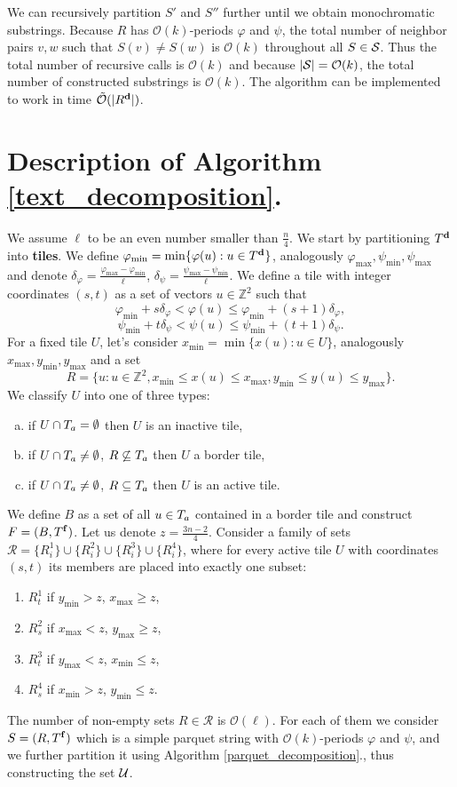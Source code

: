 \documentclass[a4paper]{article}
\newcommand{\Z}{\mathbb{Z}}
\renewcommand{\O}{\mathcal{O}}
\newcommand{\tO}{\tilde{\mathcal{O}}}
\renewcommand{\phi}{\varphi}
\newcommand{\set}[1]{\lbrace #1 \rbrace}
\begin{document}
We can recursively partition $S'$ and $S''$ further until we obtain monochromatic substrings.
Because $R$ has $\O(k)$-periods $\phi$ and $\psi$, the total number of neighbor pairs $v, w$ such that $S(v) \neq S(w)$ is $\O(k)$ throughout all $S \in \S$.
Thus the total number of recursive calls is $\O(k)$ and because $|\S| = \O(k)$, the total number of constructed substrings is $\O(k)$.
The algorithm can be implemented to work in time $\tO(|\d{R}|)$.


\section{Description of Algorithm \ref{text_decomposition}.}

We assume $\ell$ to be an even number smaller than $\frac{n}{4}$. 
We start by partitioning $\d{T}$ into \textbf{tiles}.
We define $\phi_{\min} = \min \set{\phi(u) : u \in \d{T}}$, analogously $\phi_{\max}, \psi_{\min}, \psi_{\max}$ and denote $\delta_{\phi} = \frac{\phi_{\max} - \phi_{\min}}{\ell}$, $\delta_{\psi} = \frac{\psi_{\max} - \psi_{\min}}{\ell}$.
We define a tile with integer coordinates $(s, t)$ as a set of vectors $u \in \Z^2$ such that
$$ \phi_{\min} + s \delta_{\phi} < \phi(u) \le \phi_{\min} + (s + 1)\delta_{\phi}, $$ 
$$ \psi_{\min} + t \delta_{\psi} < \psi(u) \le \psi_{\min} + (t + 1)\delta_{\psi}. $$
For a fixed tile $U$, let's consider $x_{\min} = \min \set{x(u) : u \in U}$, analogously $x_{\max}, y_{\min}, y_{\max}$ and a set
$$ R = \set{u : u \in \Z^2, x_{\min} \le x(u) \le x_{\max}, y_{\min} \le y(u) \le y_{\max}}. $$
We classify $U$ into one of three types:
\begin{enumerate}[a)]
	\item if $U \cap \Ta = \emptyset$ then $U$ is an inactive tile,
	\item if $U \cap \Ta \neq \emptyset$, $R \not \subseteq \Ta$ then $U$ a border tile,
	\item if $U \cap \Ta \neq \emptyset$, $R \subseteq \Ta$ then $U$ is an active tile.
\end{enumerate}
We define $B$ as a set of all $u \in \Ta$ contained in a border tile and construct $F = (B, \f{T})$.
Let us denote $z = \frac{3n - 2}{4}$.
Consider a family of sets $\mathcal{R} = \set{R^1_i} \cup \set{R^2_i} \cup \set{R^3_i} \cup \set{R^4_i}$,
where for every active tile $U$ with coordinates $(s, t)$ its members are placed into exactly one subset:
\begin{enumerate}[1)]
	\item $R^1_{t}$ if $y_{\min} > z$, $x_{\max} \ge z$,
	\item $R^2_{s}$ if $x_{\max} < z$, $y_{\max} \ge z$,
	\item $R^3_{t}$ if $y_{\max} < z$, $x_{\min} \le z$,
	\item $R^4_{s}$ if $x_{\min} > z$, $y_{\min} \le z$.
\end{enumerate}
The number of non-empty sets $R \in \mathcal{R}$ is $\O(\ell)$.
For each of them we consider $S = (R, \f{T})$ which is a simple parquet string with $\O(k)$-periods $\phi$ and $\psi$,
and we further partition it using Algorithm \ref{parquet_decomposition}., thus constructing the set $\U$.
\end{document}
